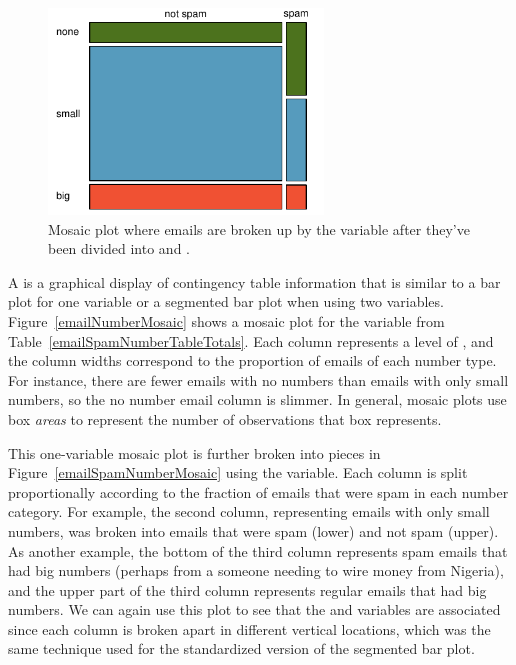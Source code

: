 \begin{figure}
   \centering
   \includegraphics[width=0.65\textwidth]{01/figures/emailSpamNumberMosaicPlot/emailSpamNumberMosaicRev}
   \caption{Mosaic plot where emails are broken up by the  variable after they've been divided into  and .}
   \label{emailSpamNumberMosaicRev}
\end{figure}

A  is a graphical display of contingency table information that is similar to a bar plot for one variable or a segmented bar plot when using two variables. Figure~\ref{emailNumberMosaic} shows a mosaic plot for the  variable from Table~\ref{emailSpamNumberTableTotals}. Each column represents a level of , and the column widths correspond to the proportion of emails of each number type. For instance, there are fewer emails with no numbers than emails with only small numbers, so the no number email column is slimmer. In general, mosaic plots use box \emph{areas} to represent the number of observations that box represents.

This one-variable mosaic plot is further broken into pieces in Figure~\ref{emailSpamNumberMosaic} using the  variable. Each column is split proportionally according to the fraction of emails that were spam in each number category. For example, the second column, representing emails with only small numbers, was broken into emails that were spam (lower) and not spam (upper). 
As another example, the bottom of the third column represents spam emails that had big numbers (perhaps from a someone needing to wire money from Nigeria), and the upper part of the third column represents regular emails that had big numbers. We can again use this plot to see that the  and  variables are associated since each column is broken apart in different vertical locations, which was the same technique used for the standardized version of the segmented bar plot.

